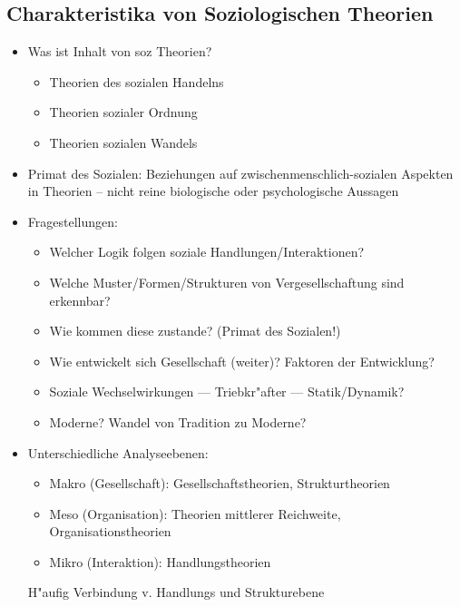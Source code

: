 \subsection{Charakteristika von Soziologischen Theorien}
\begin{itemize}
	\item
		Was ist Inhalt von soz Theorien?
		\begin{itemize}
			\item
				Theorien des sozialen Handelns
			\item
				Theorien sozialer Ordnung
			\item
				Theorien sozialen Wandels
		\end{itemize}
	\item
		Primat des Sozialen: Beziehungen auf zwischenmenschlich-sozialen Aspekten in Theorien -- nicht reine biologische oder psychologische Aussagen
	\item
		Fragestellungen:
		\begin{itemize}
			\item
				Welcher Logik folgen soziale Handlungen/Interaktionen?
			\item
				Welche Muster/Formen/Strukturen von Vergesellschaftung sind erkennbar?
			\item
				Wie kommen diese zustande? (Primat des Sozialen!)
			\item
				Wie entwickelt sich Gesellschaft (weiter)? Faktoren der Entwicklung?
			\item
				Soziale Wechselwirkungen --- Triebkr"after --- Statik/Dynamik?
			\item
				Moderne? Wandel von Tradition zu Moderne?
		\end{itemize}
	\item
		Unterschiedliche Analyseebenen:
		\begin{itemize}
			\item
				Makro (Gesellschaft): Gesellschaftstheorien, Strukturtheorien
			\item
				Meso (Organisation): Theorien mittlerer Reichweite, Organisationstheorien
			\item
				Mikro (Interaktion): Handlungstheorien
		\end{itemize}
		H"aufig Verbindung v. Handlungs und Strukturebene


\end{itemize}
